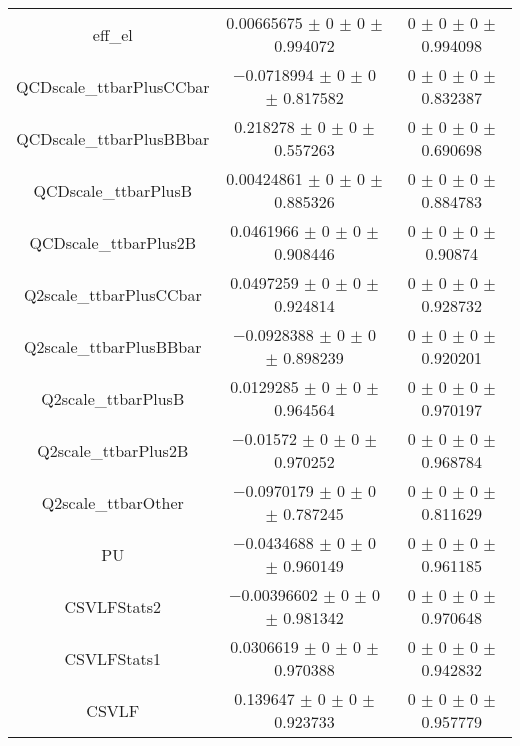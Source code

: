 \begin{table}
\begin{tabular}{ccc}
eff\_el 	& \num{0.00665675} $\pm$ \num{0} $\pm$ \num{0} $\pm$ \num{0.994072} 	& \num{0} $\pm$ \num{0} $\pm$ \num{0} $\pm$ \num{0.994098}\\
QCDscale\_ttbarPlusCCbar 	& \num{-0.0718994} $\pm$ \num{0} $\pm$ \num{0} $\pm$ \num{0.817582} 	& \num{0} $\pm$ \num{0} $\pm$ \num{0} $\pm$ \num{0.832387}\\
QCDscale\_ttbarPlusBBbar 	& \num{0.218278} $\pm$ \num{0} $\pm$ \num{0} $\pm$ \num{0.557263} 	& \num{0} $\pm$ \num{0} $\pm$ \num{0} $\pm$ \num{0.690698}\\
QCDscale\_ttbarPlusB 	& \num{0.00424861} $\pm$ \num{0} $\pm$ \num{0} $\pm$ \num{0.885326} 	& \num{0} $\pm$ \num{0} $\pm$ \num{0} $\pm$ \num{0.884783}\\
QCDscale\_ttbarPlus2B 	& \num{0.0461966} $\pm$ \num{0} $\pm$ \num{0} $\pm$ \num{0.908446} 	& \num{0} $\pm$ \num{0} $\pm$ \num{0} $\pm$ \num{0.90874}\\
Q2scale\_ttbarPlusCCbar 	& \num{0.0497259} $\pm$ \num{0} $\pm$ \num{0} $\pm$ \num{0.924814} 	& \num{0} $\pm$ \num{0} $\pm$ \num{0} $\pm$ \num{0.928732}\\
Q2scale\_ttbarPlusBBbar 	& \num{-0.0928388} $\pm$ \num{0} $\pm$ \num{0} $\pm$ \num{0.898239} 	& \num{0} $\pm$ \num{0} $\pm$ \num{0} $\pm$ \num{0.920201}\\
Q2scale\_ttbarPlusB 	& \num{0.0129285} $\pm$ \num{0} $\pm$ \num{0} $\pm$ \num{0.964564} 	& \num{0} $\pm$ \num{0} $\pm$ \num{0} $\pm$ \num{0.970197}\\
Q2scale\_ttbarPlus2B 	& \num{-0.01572} $\pm$ \num{0} $\pm$ \num{0} $\pm$ \num{0.970252} 	& \num{0} $\pm$ \num{0} $\pm$ \num{0} $\pm$ \num{0.968784}\\
Q2scale\_ttbarOther 	& \num{-0.0970179} $\pm$ \num{0} $\pm$ \num{0} $\pm$ \num{0.787245} 	& \num{0} $\pm$ \num{0} $\pm$ \num{0} $\pm$ \num{0.811629}\\
PU 	& \num{-0.0434688} $\pm$ \num{0} $\pm$ \num{0} $\pm$ \num{0.960149} 	& \num{0} $\pm$ \num{0} $\pm$ \num{0} $\pm$ \num{0.961185}\\
CSVLFStats2 	& \num{-0.00396602} $\pm$ \num{0} $\pm$ \num{0} $\pm$ \num{0.981342} 	& \num{0} $\pm$ \num{0} $\pm$ \num{0} $\pm$ \num{0.970648}\\
CSVLFStats1 	& \num{0.0306619} $\pm$ \num{0} $\pm$ \num{0} $\pm$ \num{0.970388} 	& \num{0} $\pm$ \num{0} $\pm$ \num{0} $\pm$ \num{0.942832}\\
CSVLF 	& \num{0.139647} $\pm$ \num{0} $\pm$ \num{0} $\pm$ \num{0.923733} 	& \num{0} $\pm$ \num{0} $\pm$ \num{0} $\pm$ \num{0.957779}\\

\end{tabular}
\end{table}
